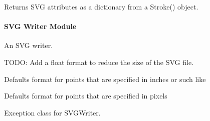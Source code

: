 \documentclass[letterpaper,10pt,english]{sphinxmanual}
\begin{document}

\begin{fulllineitems}
\label{\detokenize{ref/util/plot/Stroke:TotalDepth.util.plot.Stroke.retSVGAttrsFromStroke}}
Returns SVG attributes as a dictionary from a Stroke() object.

\end{fulllineitems}



\paragraph{SVG Writer Module}
\label{\detokenize{ref/util/plot/SVGWriter:module-TotalDepth.util.plot.SVGWriter}}\label{\detokenize{ref/util/plot/SVGWriter:svg-writer-module}}\label{\detokenize{ref/util/plot/SVGWriter::doc}}
An SVG writer.

TODO: Add a float format to reduce the size of the SVG file.

\begin{fulllineitems}
\label{\detokenize{ref/util/plot/SVGWriter:TotalDepth.util.plot.SVGWriter.DEFAULT_VALUE_FORMAT}}
Defaults format for points that are specified in inches or such like

\end{fulllineitems}


\begin{fulllineitems}
\label{\detokenize{ref/util/plot/SVGWriter:TotalDepth.util.plot.SVGWriter.DEFAULT_VALUE_FORMAT_POINTS}}
Defaults format for points that are specified in pixels

\end{fulllineitems}


\begin{fulllineitems}
\label{\detokenize{ref/util/plot/SVGWriter:TotalDepth.util.plot.SVGWriter.ExceptionSVGWriter}}
Exception class for SVGWriter.

\end{fulllineitems}
\end{document}
